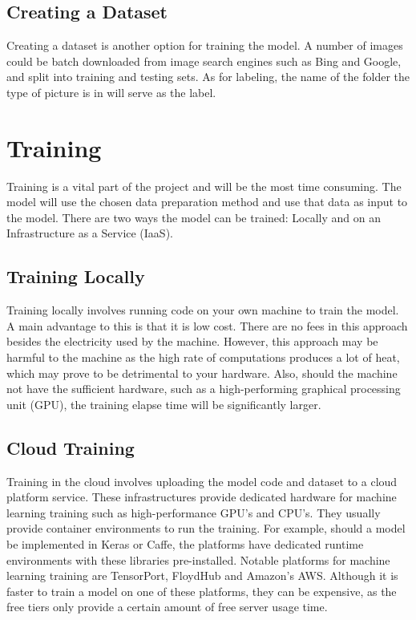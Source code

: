 \subsection{Creating a Dataset}
Creating a dataset is another option for training the model. A number of images could be batch downloaded from image search engines such as Bing and Google, and split into training and testing sets. As for labeling, the name of the folder the type of picture is in will serve as the label.

\section{Training}
Training is a vital part of the project and will be the most time consuming. The model will use the chosen data preparation method and use that data as input to the model. There are two ways the model can be trained: Locally and on an Infrastructure as a Service (IaaS).

\subsection{Training Locally}
Training locally involves running code on your own machine to train the model. A main advantage to this is that it is low cost. There are no fees in this approach besides the electricity used by the machine. However, this approach may be harmful to the machine as the high rate of computations produces a lot of heat, which may prove to be detrimental to your hardware. Also, should the machine not have the sufficient hardware, such as a high-performing graphical processing unit (GPU), the training elapse time will be significantly larger.

\subsection{Cloud Training}
Training in the cloud involves uploading the model code and dataset to a cloud platform service. These infrastructures provide dedicated hardware for machine learning training such as high-performance GPU's and CPU's. They usually provide container environments to run the training. For example, should a model be implemented in Keras or Caffe, the platforms have dedicated runtime environments with these libraries pre-installed. Notable platforms for machine learning training are TensorPort, FloydHub and Amazon's AWS. Although it is faster to train a model on one of these platforms, they can be expensive, as the free tiers only provide a certain amount of free server usage time.


